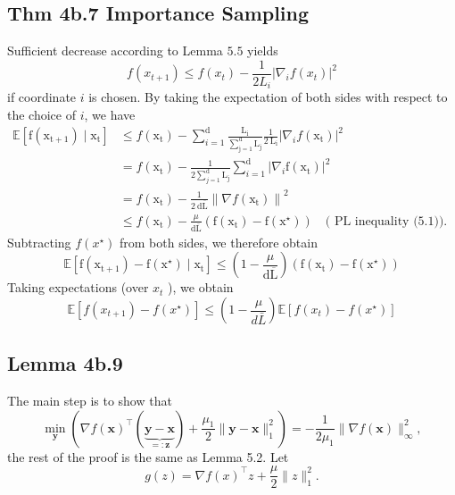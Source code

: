 \subsection*{Thm 4b.7 Importance Sampling}
Sufficient decrease according to Lemma $5.5$ yields
$$
f\left(x_{t+1}\right) \leq f\left(x_{t}\right)-\frac{1}{2 L_{i}}\left|\nabla_{i} f\left(x_{t}\right)\right|^{2}
$$
if coordinate $i$ is chosen. By taking the expectation of both sides with respect to the choice of $i$, we have
$$
\begin{aligned}
\mathbb{E}\left[\mathrm{f}\left(\mathrm{x}_{\mathrm{t}+1}\right) \mid \mathrm{x}_{\mathrm{t}}\right] & \leq f\left(\mathrm{x}_{\mathrm{t}}\right)-\sum_{i=1}^{\mathrm{d}} \frac{\mathrm{L}_{\mathrm{i}}}{\sum_{\mathrm{j}=1}^{\mathrm{d}} \mathrm{L}_{\mathrm{j}}} \frac{1}{2 \mathrm{~L}_{\mathrm{i}}}\left|\nabla_{i} f\left(\mathrm{x}_{\mathrm{t}}\right)\right|^{2} \\
&=f\left(\mathrm{x}_{\mathrm{t}}\right)-\frac{1}{2 \sum_{j=1}^{\mathrm{d}} \mathrm{L}_{\mathrm{j}}} \sum_{i=1}^{\mathrm{d}}\left|\nabla_{i} \mathrm{f}\left(\mathrm{x}_{\mathrm{t}}\right)\right|^{2} \\
&=f\left(\mathrm{x}_{\mathrm{t}}\right)-\frac{1}{2 \mathrm{~d} \overline{\mathrm{L}}}\left\|\nabla f\left(\mathrm{x}_{\mathrm{t}}\right)\right\|^{2} \\
& \leq f\left(\mathrm{x}_{\mathrm{t}}\right)-\frac{\mu}{\mathrm{d} \overline{\mathrm{L}}}\left(\mathrm{f}\left(\mathrm{x}_{\mathrm{t}}\right)-\mathrm{f}\left(\mathrm{x}^{\star}\right)\right) \quad(\text { PL inequality (5.1)). }
\end{aligned}
$$
Subtracting $f\left(x^{\star}\right)$ from both sides, we therefore obtain
$$
\mathbb{E}\left[\mathrm{f}\left(\mathrm{x}_{\mathrm{t}+1}\right)-\mathrm{f}\left(\mathrm{x}^{\star}\right) \mid \mathrm{x}_{\mathrm{t}}\right] \leq\left(1-\frac{\mu}{\mathrm{d} \overline{\mathrm{L}}}\right)\left(\mathrm{f}\left(\mathrm{x}_{\mathrm{t}}\right)-\mathrm{f}\left(\mathrm{x}^{\star}\right)\right)
$$
Taking expectations (over $x_{t}$ ), we obtain
$$
\mathbb{E}\left[f\left(x_{t+1}\right)-f\left(x^{\star}\right)\right] \leq\left(1-\frac{\mu}{d \bar{L}}\right) \mathbb{E}\left[f\left(x_{t}\right)-f\left(x^{\star}\right)\right]
$$





\subsection*{Lemma 4b.9}
The main step is to show that
$$
\min _{\mathbf{y}}\left(\nabla f(\mathbf{x})^{\top}(\underbrace{\mathbf{y}-\mathbf{x}}_{=: \mathbf{z}})+\frac{\mu_{1}}{2}\|\mathbf{y}-\mathbf{x}\|_{1}^{2}\right)=-\frac{1}{2 \mu_{1}}\|\nabla f(\mathbf{x})\|_{\infty}^{2},
$$
the rest of the proof is the same as Lemma 5.2. Let
$$
g(z)=\nabla f(x)^{\top} z+\frac{\mu}{2}\|z\|_{1}^{2} .
$$

